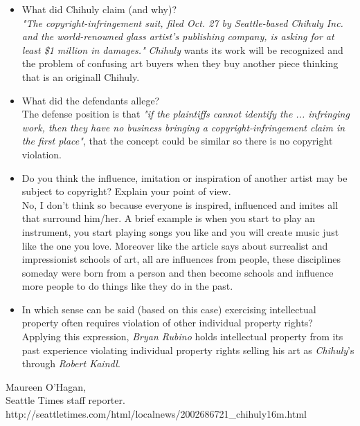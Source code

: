 \documentclass[11pt]{scrartcl}
\begin{document}
\begin{itemize}

	\item What did Chihuly claim (and why)?\\
	
		\emph{"The copyright-infringement suit, filed Oct. 27 by Seattle-based Chihuly Inc. and the world-renowned glass artist's publishing company, is asking for at least \$1 million in damages."}
		\emph{Chihuly} wants its work will be recognized and the problem of confusing art buyers when they buy another piece thinking that is an originall Chihuly.
	\item What did the defendants allege?\\
	
		The defense position is that \emph{"if the plaintiffs cannot identify the ... infringing work, then they have no business bringing a copyright-infringement claim in the first place"}, that the concept could be similar so there is no copyright violation.
	\item Do you think the influence, imitation or inspiration of another artist may be subject to copyright? Explain your point of view.\\
	
		No, I don't think so because everyone is inspired, influenced and imites all that surround him/her. A brief example is when you start to play an instrument, you start playing songs you like and you will create music just like the one you love. Moreover like the article says about surrealist and impressionist schools of art, all are influences from people, these disciplines someday were born from a person and then become schools and influence more people to do things like they do in the past.
		
	\item In which sense can be said (based on this case) exercising intellectual property often requires violation of other individual property rights?\\
	
		Applying this expression, \emph{Bryan Rubino} holds intellectual property from its past experience violating individual property rights selling his art as \emph{Chihuly}'s through \emph{Robert Kaindl}.
		
\end{itemize}

\begin{thebibliography}{9}

  Maureen O'Hagan,\\
  Seattle Times staff reporter.\\
  http://seattletimes.com/html/localnews/2002686721\_chihuly16m.html

\end{thebibliography}
\end{document}
